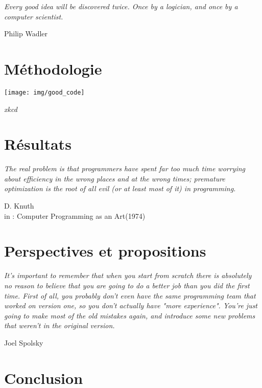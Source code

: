 \documentclass[11pt,a4paper,oneside]{report}
\begin{document}
\vspace*{\fill} \epigraph{\itshape Every good idea will be discovered twice. Once by a logician, and once by a computer scientist.}{\vspace*{12pt} Philip Wadler}
\vfill\clearpage


		
	
\chapter{Méthodologie}
\vspace{100pt}
\begin{center}
	\texttt{[image: img/good\_code]}
	
	\textit{xkcd}
\end{center}
\vfill\clearpage

	
	
\chapter{Résultats}

\vspace*{\fill} \epigraph{\itshape The real problem is that programmers have spent far too much time worrying about efficiency
	in the wrong places and at the wrong times;
	premature optimization is the root of all evil (or at least most of it) in programming.}{\vspace*{12pt} D. Knuth\\
 in : \og{}Computer Programming as an Art\fg{}(1974)}
\vfill\clearpage


		

\chapter{Perspectives et propositions}
\vspace*{\fill} \epigraph{\itshape It's important to remember that when you start from scratch there is absolutely no reason
to believe that you are going to do a better job than you did the first time.
First of all, you probably don't even have the same programming team that worked on version one,
so you don't actually have "more experience".
You're just going to make most of the old mistakes again,
and introduce some new problems that weren't in the original version.
}{Joel Spolsky}
\vfill\clearpage



	

\chapter{Conclusion}
\vfill\clearpage
		
\newpage
\thispagestyle{empty}
\vspace*{0pt}
\newpage

	
	
	
\end{document}
